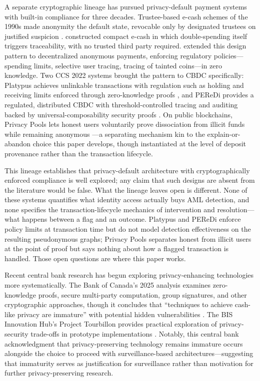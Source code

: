\documentclass[11pt]{article}
\begin{document}
A separate cryptographic lineage has pursued privacy-default payment systems with built-in compliance for three decades. Trustee-based e-cash schemes of the 1990s made anonymity the default state, revocable only by designated trustees on justified suspicion \citep{CamenischMaurerStadler1996}. \citet{Camenisch2005CompactEcash} constructed compact e-cash in which double-spending itself triggers traceability, with no trusted third party required. \citet{Garman2016Accountable} extended this design pattern to decentralized anonymous payments, enforcing regulatory policies---spending limits, selective user tracing, tracing of tainted coins---in zero knowledge. Two CCS 2022 systems brought the pattern to CBDC specifically: Platypus achieves unlinkable transactions with regulation such as holding and receiving limits enforced through zero-knowledge proofs \citep{Wuest2022Platypus}, and PEReDi provides a regulated, distributed CBDC with threshold-controlled tracing and auditing backed by universal-composability security proofs \citep{Kiayias2022PEReDi}. On public blockchains, Privacy Pools lets honest users voluntarily prove dissociation from illicit funds while remaining anonymous \citep{Buterin2024PrivacyPools}---a separating mechanism kin to the explain-or-abandon choice this paper develops, though instantiated at the level of deposit provenance rather than the transaction lifecycle.

This lineage establishes that privacy-default architecture with cryptographically enforced compliance is well explored; any claim that such designs are absent from the literature would be false. What the lineage leaves open is different. None of these systems quantifies what identity access actually buys AML detection, and none specifies the transaction-lifecycle mechanics of intervention and resolution---what happens between a flag and an outcome. Platypus and PEReDi enforce policy limits at transaction time but do not model detection effectiveness on the resulting pseudonymous graphs; Privacy Pools separates honest from illicit users at the point of proof but says nothing about how a flagged transaction is handled. Those open questions are where this paper works.

Recent central bank research has begun exploring privacy-enhancing technologies more systematically. The Bank of Canada's 2025 analysis examines zero-knowledge proofs, secure multi-party computation, group signatures, and other cryptographic approaches, though it concludes that ``techniques to achieve cash-like privacy are immature'' with potential hidden vulnerabilities \citep{BoC2025}. The BIS Innovation Hub's Project Tourbillon provides practical exploration of privacy-security trade-offs in prototype implementations \citep{Tourbillon2023}. Notably, this central bank acknowledgment that privacy-preserving technology remains immature occurs alongside the choice to proceed with surveillance-based architectures---suggesting that immaturity serves as justification for surveillance rather than motivation for further privacy-preserving research.
\end{document}
